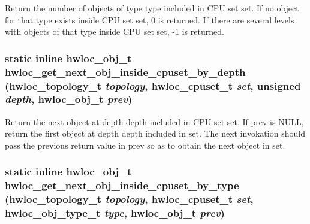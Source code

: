 Return the number of objects of type {\ttfamily type} included in CPU set {\ttfamily set}. If no object for that type exists inside CPU set {\ttfamily set}, 0 is returned. If there are several levels with objects of that type inside CPU set {\ttfamily set}, -\/1 is returned. \hypertarget{group__hwlocality__helper__find__inside_ga9f0cdb50962d59220a557757278e1919}{
\subsubsection[{hwloc\_\-get\_\-next\_\-obj\_\-inside\_\-cpuset\_\-by\_\-depth}]{\setlength{\rightskip}{0pt plus 5cm}static inline {\bf hwloc\_\-obj\_\-t} hwloc\_\-get\_\-next\_\-obj\_\-inside\_\-cpuset\_\-by\_\-depth ({\bf hwloc\_\-topology\_\-t} {\em topology}, \/  {\bf hwloc\_\-cpuset\_\-t} {\em set}, \/  unsigned {\em depth}, \/  {\bf hwloc\_\-obj\_\-t} {\em prev})}}
\label{group__hwlocality__helper__find__inside_ga9f0cdb50962d59220a557757278e1919}


Return the next object at depth {\ttfamily depth} included in CPU set {\ttfamily set}. If {\ttfamily prev} is {\ttfamily NULL}, return the first object at depth {\ttfamily depth} included in {\ttfamily set}. The next invokation should pass the previous return value in {\ttfamily prev} so as to obtain the next object in {\ttfamily set}. \hypertarget{group__hwlocality__helper__find__inside_ga060d4f60652ef68bc25bf83e5db1fdb9}{
\subsubsection[{hwloc\_\-get\_\-next\_\-obj\_\-inside\_\-cpuset\_\-by\_\-type}]{\setlength{\rightskip}{0pt plus 5cm}static inline {\bf hwloc\_\-obj\_\-t} hwloc\_\-get\_\-next\_\-obj\_\-inside\_\-cpuset\_\-by\_\-type ({\bf hwloc\_\-topology\_\-t} {\em topology}, \/  {\bf hwloc\_\-cpuset\_\-t} {\em set}, \/  {\bf hwloc\_\-obj\_\-type\_\-t} {\em type}, \/  {\bf hwloc\_\-obj\_\-t} {\em prev})}}
\label{group__hwlocality__helper__find__inside_ga060d4f60652ef68bc25bf83e5db1fdb9}


